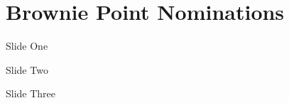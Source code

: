 \section{Brownie Point Nominations}

\begin{frame}{Slide One}

\end{frame}

\begin{frame}{Slide Two}

\end{frame}

\begin{frame}{Slide Three}

\end{frame}